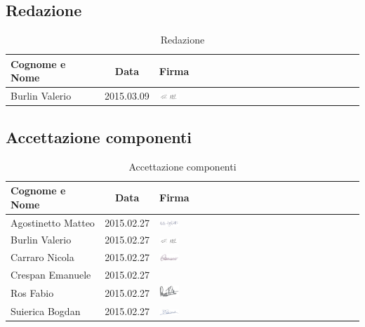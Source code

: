 \subsection{Redazione}

\begin{table}[h]
	\centering
	\begin{tabular}{|l|c|l|}
		\toprule
		\textbf{Cognome e Nome} & \textbf{Data} & \textbf{Firma} \\
		
		\midrule
		Burlin Valerio & 2015.03.09 & \includegraphics[width=0.1\textwidth]{./img/valerio_burlin.png} \\
		
		\bottomrule
	\end{tabular}
	\caption{Redazione}
\end{table}

\subsection{Accettazione componenti}

\begin{table}[h]
	\centering
	\begin{tabular}{|l|c|l|}
		\toprule
		\textbf{Cognome e Nome} & \textbf{Data} & \textbf{Firma} \\
		
		\midrule
		Agostinetto Matteo & 2015.02.27 & \includegraphics[width=0.1\textwidth]{./img/matteo_agostinetto.png} \\
		Burlin Valerio & 2015.02.27 & \includegraphics[width=0.1\textwidth]{./img/valerio_burlin.png} \\ 
		Carraro Nicola & 2015.02.27 & \includegraphics[width=0.1\textwidth]{./img/nicola_carraro.png} \\
		Crespan Emanuele & 2015.02.27 & \\
		Ros Fabio & 2015.02.27 & \includegraphics[width=0.1\textwidth]{./img/fabio_ros.png} \\
		Suierica Bogdan & 2015.02.27 & \includegraphics[width=0.1\textwidth]{./img/bogdan_suierica.png} \\
		
		\bottomrule
	\end{tabular}
	\caption{Accettazione componenti}
\end{table}

